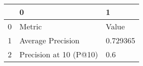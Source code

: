 \begin{tabular}{lll}
\toprule
{} &                       0 &         1 \\
\midrule
0 &                  Metric &     Value \\
1 &       Average Precision &  0.729365 \\
2 &  Precision at 10 (P@10) &       0.6 \\
\bottomrule
\end{tabular}
